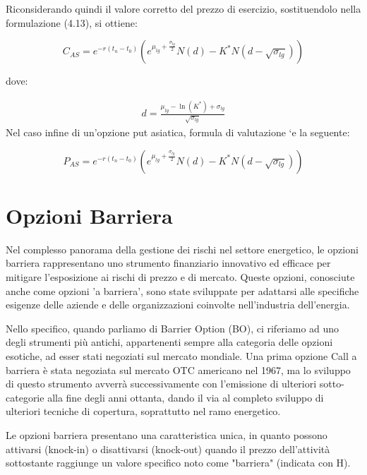 \documentclass[12pt,a4paper]{report}
\begin{document}
Riconsiderando quindi il valore corretto del prezzo di esercizio, sostituendolo nella formulazione (4.13), si ottiene:

\begin{equation}
    C_{AS} = e^{-r(t_n - t_0)} \left( e^{\mu_{lg} + \frac{\sigma_{lg}}{2}} N(d) - K^*N\left(d - \sqrt{\sigma_{lg}}\right) \right)
\end{equation}

dove: 

\begin{align*}
     d = \frac{\mu_{lg} - \ln(K^*) + \sigma_{lg}}{\sqrt{\sigma_{lg}}}
\end{align*}
 Nel caso infine di un’opzione put asiatica, formula di valutazione `e la seguente:

\begin{equation}
    P_{AS} = e^{-r(t_n - t_0)} \left( e^{\mu_{lg} + \frac{\sigma_{lg}}{2}} N(d) - K^*N\left(d - \sqrt{\sigma_{lg}}\right) \right)
\end{equation}


\section{Opzioni Barriera}

Nel complesso panorama della gestione dei rischi nel settore energetico, le opzioni barriera rappresentano uno strumento finanziario innovativo ed efficace per mitigare l'esposizione ai rischi di prezzo e di mercato. Queste opzioni, conosciute anche come opzioni 'a barriera', sono state sviluppate per adattarsi alle specifiche esigenze delle aziende e delle organizzazioni coinvolte nell'industria dell'energia. 

Nello specifico, quando parliamo di Barrier Option (BO), ci riferiamo ad uno degli strumenti più antichi, appartenenti sempre alla categoria delle opzioni esotiche, ad esser stati negoziati sul mercato mondiale. Una prima opzione Call a barriera è stata negoziata sul mercato OTC americano nel 1967, ma lo sviluppo di questo strumento avverrà successivamente con l'emissione di ulteriori sotto-categorie alla fine degli anni ottanta, dando il via al completo sviluppo di ulteriori tecniche di copertura, soprattutto nel ramo energetico.

Le opzioni barriera presentano una caratteristica unica, in quanto possono attivarsi (knock-in) o disattivarsi (knock-out) quando il prezzo dell'attività sottostante raggiunge un valore specifico noto come "barriera" (indicata con H).
\end{document}
